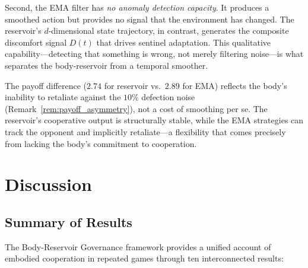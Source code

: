 \documentclass[11pt,a4paper]{article}
\theoremstyle{definition}
\begin{document}
Second, the EMA filter has \emph{no anomaly detection capacity}.  It produces a
smoothed action but provides no signal that the environment has changed.  The
reservoir's $d$-dimensional state trajectory, in contrast, generates the
composite discomfort signal $D(t)$ that drives sentinel adaptation.  This
qualitative capability---detecting that something is wrong, not merely
filtering noise---is what separates the body-reservoir from a temporal
smoother.

The payoff difference ($2.74$ for reservoir vs.\ $2.89$ for EMA) reflects
the body's inability to retaliate against the $10\%$ defection noise
(Remark~\ref{rem:payoff_asymmetry}), not a cost of smoothing per se.
The reservoir's cooperative output is structurally stable, while the EMA
strategies can track the opponent and implicitly retaliate---a flexibility
that comes precisely from lacking the body's commitment to cooperation.

\section{Discussion}
\label{sec:discussion}

\subsection{Summary of Results}

The Body-Reservoir Governance framework provides a unified account of
embodied cooperation in repeated games through ten interconnected results:
\end{document}
